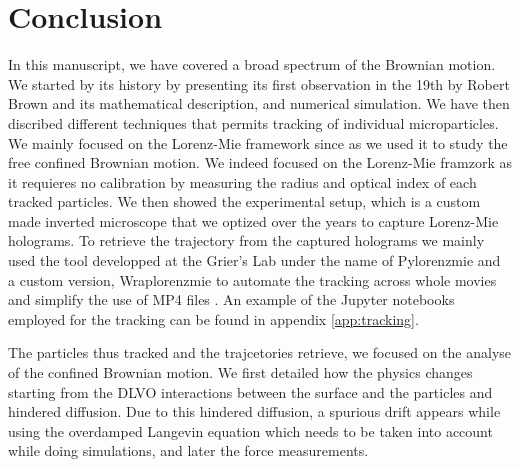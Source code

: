 











































\section{Conclusion}

In this manuscript, we have covered a broad spectrum of the Brownian motion. We started by its history by presenting its first observation in the 19th by Robert Brown and its mathematical description, and numerical simulation. We have then discribed different techniques that permits tracking of individual microparticles. We mainly focused on the Lorenz-Mie framework since as we used it to study the free confined Brownian motion. We indeed focused on the Lorenz-Mie framzork as it requieres no calibration by measuring the radius and optical index of each tracked particles. We then showed the experimental setup, which is a custom made inverted microscope that we optized over the years to capture Lorenz-Mie holograms. To retrieve the trajectory from the captured holograms we mainly used the tool developped at the Grier's Lab under the name of Pylorenzmie \href{https://github.com/davidgrier/pylorenzmie}{\faGithub} and a custom version, Wraplorenzmie to automate the tracking across whole movies and simplify the use of MP4 files \href{https://github.com/eXpensia/wraplorenzmie}{\faGithub}. An example of the Jupyter notebooks employed for the tracking can be found in appendix \ref{app:tracking}.

The particles thus tracked and the trajcetories retrieve, we focused on the analyse of the confined Brownian motion. We first detailed how the physics changes starting from the DLVO interactions between the surface and the particles and hindered diffusion. Due to this hindered diffusion, a spurious drift appears while using the overdamped Langevin equation which needs to be taken into account while doing simulations, and later the force measurements.

